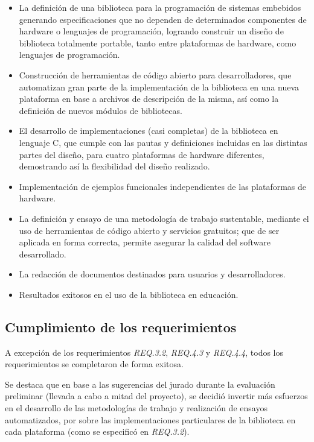 \begin{itemize}
\item
La definición de una biblioteca para la programación de sistemas embebidos generando especificaciones que no dependen de determinados componentes de hardware o lenguajes de programación, logrando construir un diseño de biblioteca totalmente portable, tanto entre plataformas de hardware, como lenguajes de programación.
\item
Construcción de herramientas de código abierto para desarrolladores, que automatizan gran parte de la implementación de la biblioteca en una nueva plataforma en base a archivos de descripción de la misma, así como la definición de nuevos módulos de bibliotecas.
\item
El desarrollo de implementaciones (casi completas) de la biblioteca en lenguaje C, que cumple con las pautas y definiciones incluidas en las distintas partes del diseño, para cuatro plataformas de hardware diferentes, demostrando así la flexibilidad del diseño realizado. 
\item
Implementación de ejemplos funcionales independientes de las plataformas de hardware.
\item
La definición y ensayo de una metodología de trabajo sustentable, mediante el uso de herramientas de código abierto y servicios gratuitos; que de ser aplicada en forma correcta, permite asegurar la calidad del software desarrollado.
\item
La redacción de documentos destinados para usuarios y desarrolladores.
\item
Resultados exitosos en el uso de la biblioteca en educación.
\end{itemize}

\subsection{Cumplimiento de los requerimientos}

A excepción de los requerimientos \emph{REQ.3.2}, \emph{REQ.4.3} y \emph{REQ.4.4}, todos los requerimientos se completaron de forma exitosa.

Se destaca que en base a las sugerencias del jurado durante la evaluación preliminar (llevada a cabo a mitad del proyecto), se decidió invertir más esfuerzos en el desarrollo de las metodologías de trabajo y realización de ensayos automatizados, por sobre las implementaciones particulares de la biblioteca en cada plataforma (como se especificó en \emph{REQ.3.2}). 


